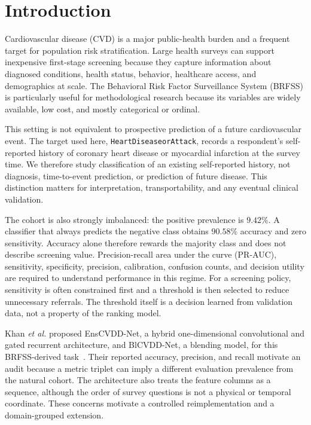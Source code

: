 \documentclass[conference,10pt]{IEEEtran}
\begin{document}
\section{Introduction}
Cardiovascular disease (CVD) is a major public-health burden and a frequent target for population risk stratification. Large health surveys can support inexpensive first-stage screening because they capture information about diagnosed conditions, health status, behavior, healthcare access, and demographics at scale. The Behavioral Risk Factor Surveillance System (BRFSS) is particularly useful for methodological research because its variables are widely available, low cost, and mostly categorical or ordinal.

This setting is not equivalent to prospective prediction of a future cardiovascular event. The target used here, \texttt{HeartDiseaseorAttack}, records a respondent's self-reported history of coronary heart disease or myocardial infarction at the survey time. We therefore study classification of an existing self-reported history, not diagnosis, time-to-event prediction, or prediction of future disease. This distinction matters for interpretation, transportability, and any eventual clinical validation.

The cohort is also strongly imbalanced: the positive prevalence is $9.42\%$. A classifier that always predicts the negative class obtains $90.58\%$ accuracy and zero sensitivity. Accuracy alone therefore rewards the majority class and does not describe screening value. Precision-recall area under the curve (PR-AUC), sensitivity, specificity, precision, calibration, confusion counts, and decision utility are required to understand performance in this regime. For a screening policy, sensitivity is often constrained first and a threshold is then selected to reduce unnecessary referrals. The threshold itself is a decision learned from validation data, not a property of the ranking model.

Khan \emph{et al.} proposed EnsCVDD-Net, a hybrid one-dimensional convolutional and gated recurrent architecture, and BlCVDD-Net, a blending model, for this BRFSS-derived task~\cite{khan2024heart}. Their reported accuracy, precision, and recall motivate an audit because a metric triplet can imply a different evaluation prevalence from the natural cohort. The architecture also treats the feature columns as a sequence, although the order of survey questions is not a physical or temporal coordinate. These concerns motivate a controlled reimplementation and a domain-grouped extension.
\end{document}
